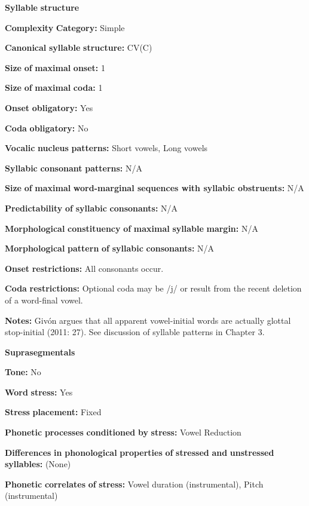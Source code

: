\begin{styleBody}
\textbf{Syllable} \textbf{structure}

\textbf{Complexity} \textbf{Category:} Simple

\textbf{Canonical} \textbf{syllable} \textbf{structure:} CV(C) \citep[27-28]{Givón2011}

\textbf{Size} \textbf{of} \textbf{maximal} \textbf{onset:} 1

\textbf{Size} \textbf{of} \textbf{maximal} \textbf{coda:} 1

\textbf{Onset} \textbf{obligatory:} Yes

\textbf{Coda} \textbf{obligatory:} No

\textbf{Vocalic} \textbf{nucleus} \textbf{patterns:} Short vowels, Long vowels

\textbf{Syllabic} \textbf{consonant} \textbf{patterns:} N/A

\textbf{Size} \textbf{of} \textbf{maximal} \textbf{word{}-marginal sequences with syllabic obstruents:} N/A

\textbf{Predictability} \textbf{of} \textbf{syllabic} \textbf{consonants:} N/A

\textbf{Morphological} \textbf{constituency} \textbf{of} \textbf{maximal} \textbf{syllable} \textbf{margin:} N/A

\textbf{Morphological} \textbf{pattern} \textbf{of} \textbf{syllabic} \textbf{consonants:} N/A

\textbf{Onset} \textbf{restrictions:} All consonants occur.

\textbf{Coda} \textbf{restrictions:} Optional coda may be /j/ or result from the recent deletion of a word-final vowel. 

\textbf{Notes:} Givón argues that all apparent vowel-initial words are actually glottal stop-initial (2011: 27). See discussion of syllable patterns in Chapter 3.

\textbf{Suprasegmentals}

\textbf{Tone:} No

\textbf{Word} \textbf{stress:} Yes

\textbf{Stress} \textbf{placement:} Fixed

\textbf{Phonetic} \textbf{processes} \textbf{conditioned} \textbf{by} \textbf{stress:} Vowel Reduction

\textbf{Differences} \textbf{in} \textbf{phonological} \textbf{properties} \textbf{of} \textbf{stressed} \textbf{and} \textbf{unstressed} \textbf{syllables:} (None)

\textbf{Phonetic} \textbf{correlates} \textbf{of} \textbf{stress:} Vowel duration (instrumental), Pitch (instrumental)


\end{styleBody}
